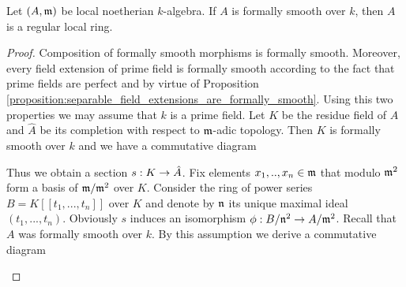 \begin{theorem}\label{theorem:formally_smooth_noetherian_algebra_over_field_is_regular}
Let $(A,\mathfrak{m})$ be local noetherian $k$-algebra. If $A$ is formally smooth over $k$, then $A$ is a regular local ring.
\end{theorem}
\begin{proof}
Composition of formally smooth morphisms is formally smooth. Moreover, every field extension of prime field is formally smooth according to the fact that prime fields are perfect and by virtue of Proposition \ref{proposition:separable_field_extensions_are_formally_smooth}. Using this two properties we may assume that $k$ is a prime field. Let $K$ be the residue field of $A$ and $\hat{A}$ be its completion with respect to $\mathfrak{m}$-adic topology. Then $K$ is formally smooth over $k$ and we have a commutative diagram
\begin{center}
\end{center}
Thus we obtain a section $s:K \rightarrow \hat{A}$. Fix elements $x_1,..,x_n\in \mathfrak{m}$ that modulo $\mathfrak{m}^2$ form a basis of $\mathfrak{m}/\mathfrak{m}^2$ over $K$. Consider the ring of power series $B=K[[t_1,...,t_n]]$ over $K$ and denote by $\mathfrak{n}$ its unique maximal ideal $(t_1,...,t_n)$. Obviously $s$ induces an isomorphism $\phi:B/\mathfrak{n}^2\rightarrow A/\mathfrak{m}^2$. Recall that $A$ was formally smooth over $k$. By this assumption we derive a commutative diagram
\begin{center}
\end{center}
\end{proof}
